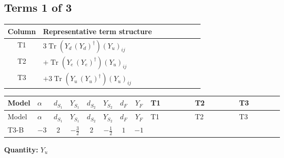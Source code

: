 \documentclass[8pt]{article}
\begin{document}
\begin{landscape}
\subsection*{Terms 1 of 3}
\begin{center}
\begin{tabular}{@{}c >{\raggedright\arraybackslash}p{0.82\linewidth}@{}}
\toprule
Column & Representative term structure \\
\midrule
T1 & \(\displaystyle 3 \operatorname{Tr}\!\left({Y_d}\,\left({Y_d}\right)^{\dagger}\right) \left({Y_u}\right)_{ij}\) \\
\midrule
T2 & \(\displaystyle +\operatorname{Tr}\!\left({Y_e}\,\left({Y_e}\right)^{\dagger}\right) \left({Y_u}\right)_{ij}\) \\
\midrule
T3 & \(\displaystyle +3 \operatorname{Tr}\!\left({Y_u}\,\left({Y_u}\right)^{\dagger}\right) \left({Y_u}\right)_{ij}\) \\
\midrule
\bottomrule
\end{tabular}
\end{center}
\smallskip
\tiny
\begin{longtable}{@{}llcccccc >{\raggedright\arraybackslash}p{0.21\linewidth} >{\raggedright\arraybackslash}p{0.21\linewidth} >{\raggedright\arraybackslash}p{0.21\linewidth}@{}}
\toprule
Model & $\alpha$ & $d_{S_1}$ & $Y_{S_1}$ & $d_{S_2}$ & $Y_{S_2}$ & $d_F$ & $Y_F$ & T1 & T2 & T3 \\
\midrule
\endfirsthead
\toprule
Model & $\alpha$ & $d_{S_1}$ & $Y_{S_1}$ & $d_{S_2}$ & $Y_{S_2}$ & $d_F$ & $Y_F$ & T1 & T2 & T3 \\
\midrule
\endhead
T3-B & $-3$ & $2$ & $-\frac{3}{2}$ & $2$ & $-\frac{1}{2}$ & $1$ & $-1$ & \scriptsize\adjustbox{max width=\linewidth}{$\begin{gathered} 3 \operatorname{Tr}\!\left({Y_d}\,\left({Y_d}\right)^{\dagger}\right) \left({Y_u}\right)_{ij}\end{gathered}$} & \scriptsize\adjustbox{max width=\linewidth}{$\begin{gathered} +\operatorname{Tr}\!\left({Y_e}\,\left({Y_e}\right)^{\dagger}\right) \left({Y_u}\right)_{ij}\end{gathered}$} & \scriptsize\adjustbox{max width=\linewidth}{$\begin{gathered} +3 \operatorname{Tr}\!\left({Y_u}\,\left({Y_u}\right)^{\dagger}\right) \left({Y_u}\right)_{ij}\end{gathered}$} \\
\midrule
\bottomrule
\end{longtable}
\clearpage
\noindent\textbf{Quantity: }$Y_u$\par\smallskip

\end{landscape}
\end{document}
